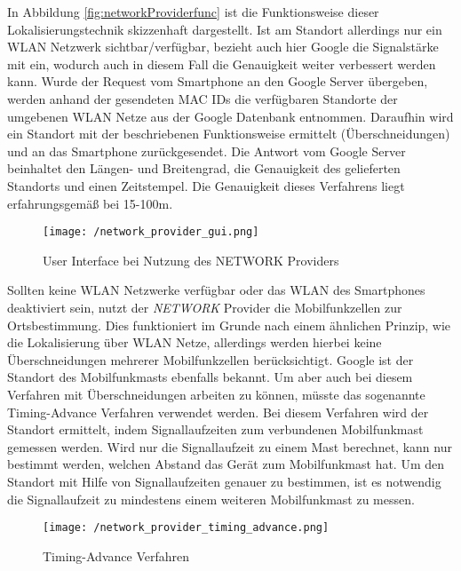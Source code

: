 In Abbildung \ref{fig:networkProviderfunc} ist die Funktionsweise dieser Lokalisierungstechnik skizzenhaft dargestellt. Ist am Standort allerdings nur ein WLAN Netzwerk sichtbar/verfügbar, bezieht auch hier Google die Signalstärke mit ein, wodurch auch in diesem Fall die Genauigkeit weiter verbessert werden kann.
Wurde der Request vom Smartphone an den Google Server übergeben, werden anhand der gesendeten MAC IDs die verfügbaren Standorte der umgebenen WLAN Netze aus der Google Datenbank entnommen. Daraufhin wird ein Standort mit der beschriebenen Funktionsweise ermittelt (Überschneidungen) und an das Smartphone zurückgesendet. Die Antwort vom Google Server beinhaltet den Längen- und Breitengrad, die Genauigkeit des gelieferten Standorts und einen Zeitstempel. Die Genauigkeit dieses Verfahrens liegt erfahrungsgemäß bei 15-100m.

\begin{figure}[H]
\centering
\texttt{[image: /network\_provider\_gui.png]}
\caption[Lokalisierung: User Interface bei Nutzung des NETWORK Providers]{User Interface bei Nutzung des NETWORK Providers}
\label{fig:networkProviderGui}
\end{figure}

Sollten keine WLAN Netzwerke verfügbar oder das WLAN des Smartphones deaktiviert sein, nutzt der \textit{NETWORK} Provider die Mobilfunkzellen zur Ortsbestimmung. Dies funktioniert im Grunde nach einem ähnlichen Prinzip, wie die Lokalisierung über WLAN Netze, allerdings werden hierbei keine Überschneidungen mehrerer Mobilfunkzellen berücksichtigt. Google ist der Standort des Mobilfunkmasts ebenfalls bekannt. Um aber auch bei diesem Verfahren mit Überschneidungen arbeiten zu können, müsste das sogenannte Timing-Advance Verfahren verwendet werden. Bei diesem Verfahren wird der Standort ermittelt, indem Signallaufzeiten zum verbundenen Mobilfunkmast gemessen werden. Wird nur die Signallaufzeit zu einem Mast berechnet, kann nur bestimmt werden, welchen Abstand das Gerät zum Mobilfunkmast hat. Um den Standort mit Hilfe von Signallaufzeiten genauer zu bestimmen, ist es notwendig die Signallaufzeit zu mindestens einem weiteren Mobilfunkmast zu messen.

\begin{figure}[H]
\centering
\texttt{[image: /network\_provider\_timing\_advance.png]}
\caption[Lokalisierung: Timing-Advance Verfahren]{Timing-Advance Verfahren}
\label{fig:networkProviderTimingAdvance}
\end{figure}


